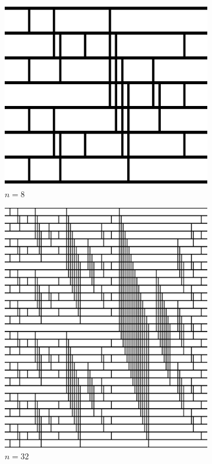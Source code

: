 		\begin{figure}[h]
				\centering
				\begin{subfigure}{0.3\textwidth}
					\includegraphics[width=\textwidth]{kep/sort8.eps}
					\caption{$n=8$}
				\end{subfigure}
				\hspace{0.1\textwidth}
				\begin{subfigure}{0.58\textwidth}
					\includegraphics[width=\textwidth]{kep/sort32.eps}
					\caption{$n=32$}
				\end{subfigure}
				\caption{}
				\label{fig:batcher-sort}
			\end{figure}
